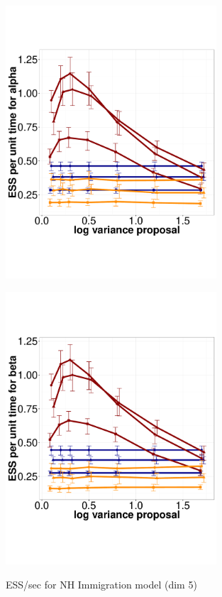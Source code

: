   \begin{figure}%
  \centering
  \begin{minipage}[!hp]{0.45\linewidth}
  \centering
    \includegraphics [width=0.70\textwidth, angle=0]{figs/pc_5_alpha.pdf}
      \end{minipage}
  \begin{minipage}[!hp]{0.45\linewidth}
  \centering
    \includegraphics [width=0.70\textwidth, angle=0]{figs/pc_5_beta.pdf}
    \vspace{-0 in}
     \label{fig:ESS_Q_5}
  \end{minipage}
    \caption{ESS/sec for NH Immigration model (dim 5)}
  \end{figure}

